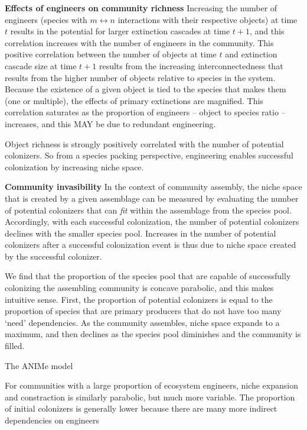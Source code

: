 \documentclass[twocolumn,preprintnumbers,amsmath,amssymb,superscriptaddress]{revtex4}
\begin{document}
{\bf Effects of engineers on community richness} 
Increasing the number of engineers (species with $m \leftrightarrow n$ interactions with their respective objects) at time $t$ results in the potential for larger extinction cascades at time $t+1$, and this correlation increases with the number of engineers in the community.
This positive correlation between the number of objects at time $t$ and extinction cascade size at time $t+1$ results from the increasing interconnectedness that results from the higher number of objects relative to species in the system.
Because the existence of a given object is tied to the species that makes them (one or multiple), the effects of primary extinctions are magnified.
This correlation saturates as the proportion of engineers -- object to species ratio -- increases, and this MAY be due to redundant engineering.

Object richness is strongly positively correlated with the number of potential colonizers.
So from a species packing perspective, engineering enables successful colonization by increasing niche space.

{\bf Community invasibility} 
In the context of community assembly, the niche space that is created by a given assemblage can be measured by evaluating the number of potential colonizers that can \emph{fit} within the assemblage from the species pool.
Accordingly, with each successful colonization, the number of potential colonizers declines with the smaller species pool.
Increases in the number of potential colonizers after a successful colonization event is thus due to niche space created by the successful colonizer.

We find that the proportion of the species pool that are capable of successfully colonizing the assembling community is concave parabolic, and this makes intuitive sense.
First, the proportion of potential colonizers is equal to the proportion of species that are primary producers that do not have too many `need' dependencies.
As the community assembles, niche space expands to a maximum, and then declines as the species pool diminishes and the community is filled.

The ANIMe model 

For communities with a large proportion of ecosystem engineers, niche expansion and constraction is similarly parabolic, but much more variable.
The proportion of initial colonizers is generally lower because there are many more indirect dependencies on engineers
\end{document}
